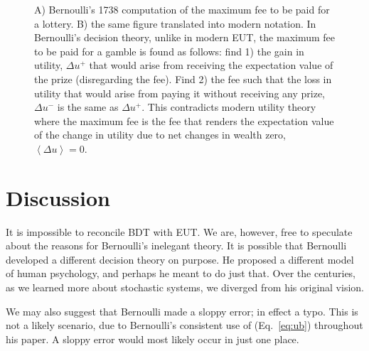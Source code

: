 \documentclass[pdftex]{article}
\newcommand{\ave}[1]{\left\langle#1 \right\rangle}
\newcommand{\eref}[1]{(Eq.~\ref{eq:#1})}
\newcommand{\flabel}[1]{\label{fig:#1}}
\newcommand{\seclabel}[1]{\label{section:#1}}
\newcommand{\Du}{\Delta u}
\begin{document}
\begin{figure}
\begin{picture}
\end{picture}
\caption{\small  A) Bernoulli's 1738 computation of the maximum fee to be paid for a lottery. B) the same figure translated into modern notation. In Bernoulli's decision theory, unlike in modern EUT, the maximum fee to be paid for a gamble is found as follows: find 1) the gain in utility, $\Du^+$ that would arise from receiving the expectation value of the prize (disregarding the fee). Find 2) the fee such that the loss in utility that would arise from paying it without receiving any prize, $\Du^-$ is the same as $\Du^+$. This contradicts modern utility theory where the maximum fee is the fee that renders the expectation value of the change in utility due to net changes in wealth zero, $\ave{\Du}=0$.}
\flabel{key}
\end{figure}


\section{Discussion}
\seclabel{Discussion}
It is impossible to reconcile BDT with EUT. 
We are, however, free to speculate about the reasons for Bernoulli's inelegant theory. It is possible that Bernoulli developed a different decision theory on purpose. He proposed a different model of human psychology, and perhaps he meant to do just that. Over the centuries, as we learned more about stochastic systems, we diverged from his original vision. 

We may also suggest that Bernoulli made a sloppy error; in effect a typo. This is not a likely scenario, due to Bernoulli's consistent use of \eref{ub} throughout his paper. A sloppy error would most likely occur in just one place.
\end{document}
